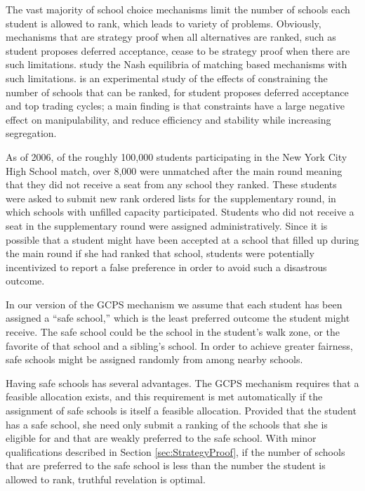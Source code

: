 \documentclass[12pt]{article}
\theoremstyle{definition}
\begin{document}
The vast majority of school choice mechanisms limit the number of schools each student is allowed to rank, which leads to variety of problems.  Obviously, mechanisms that are strategy proof when all alternatives are ranked,  such as student proposes deferred acceptance, cease to be strategy proof when there are such limitations.    \cite{hk09jet} study the Nash equilibria of matching based mechanisms with such limitations.  \cite{chk10aer} is an experimental study of the effects of constraining the number of schools that can be ranked, for student proposes deferred acceptance and top trading cycles; a main finding is that constraints have a large negative effect on manipulability, and reduce efficiency and stability while increasing segregation.


As of 2006, of the roughly 100,000 students participating in the New York City High School match, over 8,000 were unmatched after the main round \citep{Pat06} meaning that they did not receive a seat from any school they ranked.  These students were asked to submit new rank ordered lists for the supplementary round, in which schools with unfilled capacity participated.  Students who did not receive a seat in the supplementary round were assigned administratively.  Since it is possible that a student might have been accepted at a school that filled up during the main round if she had ranked that school, students were potentially incentivized to report a false preference in order to avoid such a disastrous outcome.  

In our version of the GCPS mechanism we assume that each student has been assigned a ``safe school,'' which is the least preferred outcome the student might receive.  The safe school could be the school in the student's walk zone, or the favorite of that school and a sibling's school.  In order to achieve greater fairness, safe schools might be assigned randomly from among nearby schools.  

Having safe schools has several advantages.  The GCPS mechanism requires that a feasible allocation exists, and this requirement is met automatically if the assignment of safe schools is itself a feasible allocation.  Provided that the student has a safe school, she need only submit a ranking of the schools that she is eligible for and that are weakly preferred to the safe school.  With minor qualifications described in Section \ref{sec:StrategyProof}, if the number of schools that are preferred to the safe school is less than the number the student is allowed to rank, truthful revelation is optimal.  
\end{document}
